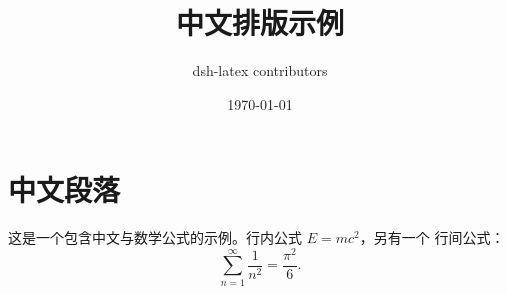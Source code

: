 \documentclass[UTF8]{ctexart}
\title{中文排版示例}
\author{dsh-latex contributors}
\date{\today}
\begin{document}
\maketitle

\section{中文段落}
这是一个包含中文与数学公式的示例。行内公式 $E = mc^2$，另有一个
行间公式：
\begin{equation}
  \sum_{n=1}^{\infty} \frac{1}{n^2} = \frac{\pi^2}{6}.
\end{equation}
\end{document}
